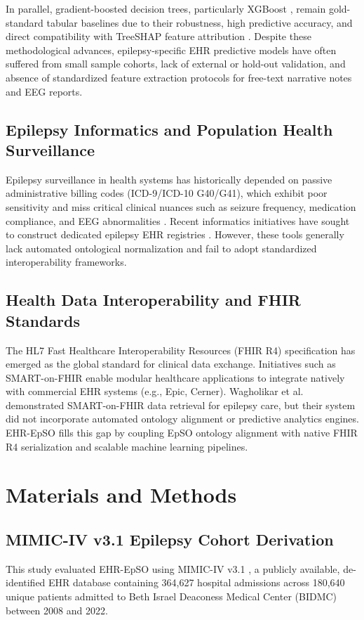 \documentclass[11pt,a4paper]{article}
\begin{document}
In parallel, gradient-boosted decision trees, particularly XGBoost \cite{chen2016xgboost}, remain gold-standard tabular baselines due to their robustness, high predictive accuracy, and direct compatibility with TreeSHAP feature attribution \cite{lundberg2017unified}. Despite these methodological advances, epilepsy-specific EHR predictive models have often suffered from small sample cohorts, lack of external or hold-out validation, and absence of standardized feature extraction protocols for free-text narrative notes and EEG reports.

\subsection{Epilepsy Informatics and Population Health Surveillance}
Epilepsy surveillance in health systems has historically depended on passive administrative billing codes (ICD-9/ICD-10 G40/G41), which exhibit poor sensitivity and miss critical clinical nuances such as seizure frequency, medication compliance, and EEG abnormalities \cite{lamberts2020epilepsy}. Recent informatics initiatives have sought to construct dedicated epilepsy EHR registries \cite{lam2022machine, asadi2023drug}. However, these tools generally lack automated ontological normalization and fail to adopt standardized interoperability frameworks.

\subsection{Health Data Interoperability and FHIR Standards}
The HL7 Fast Healthcare Interoperability Resources (FHIR R4) specification \cite{hl7fhirr4} has emerged as the global standard for clinical data exchange. Initiatives such as SMART-on-FHIR \cite{mandl2016smart, braunstein2022health} enable modular healthcare applications to integrate natively with commercial EHR systems (e.g., Epic, Cerner). Wagholikar et al.\ \cite{wagholikar2021smart} demonstrated SMART-on-FHIR data retrieval for epilepsy care, but their system did not incorporate automated ontology alignment or predictive analytics engines. EHR-EpSO fills this gap by coupling EpSO ontology alignment with native FHIR R4 serialization and scalable machine learning pipelines.

\section{Materials and Methods}

\subsection{MIMIC-IV v3.1 Epilepsy Cohort Derivation}
This study evaluated EHR-EpSO using MIMIC-IV v3.1 \cite{johnson2024mimic}, a publicly available, de-identified EHR database containing 364,627 hospital admissions across 180,640 unique patients admitted to Beth Israel Deaconess Medical Center (BIDMC) between 2008 and 2022. 
\end{document}
